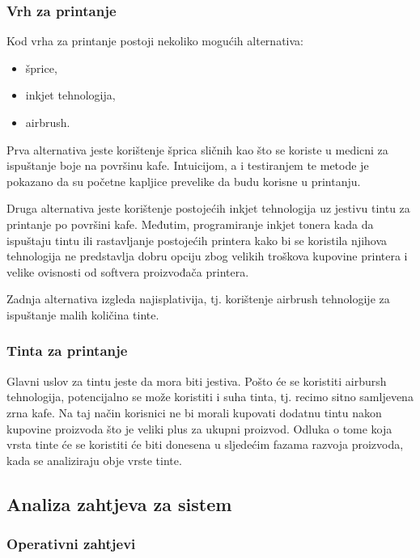 \documentclass[12pt]{article}
\begin{document}
\subsubsection{Vrh za printanje}
Kod vrha za printanje postoji nekoliko mogućih alternativa:
\begin{itemize}
\item šprice,
\item inkjet tehnologija,
\item airbrush.
\end{itemize}

Prva alternativa jeste korištenje šprica sličnih kao što se koriste u medicni za ispuštanje boje na površinu kafe. Intuicijom, a i testiranjem te metode je pokazano da su početne kapljice prevelike da budu korisne u printanju.

Druga alternativa jeste korištenje postojećih inkjet tehnologija uz jestivu tintu za printanje po površini kafe. Međutim, programiranje inkjet tonera kada da ispuštaju tintu ili rastavljanje postojećih printera kako bi se koristila njihova tehnologija ne predstavlja dobru opciju zbog velikih troškova kupovine printera i velike ovisnosti od softvera proizvođača printera.

Zadnja alternativa izgleda najisplativija, tj. korištenje airbrush tehnologije za ispuštanje malih količina tinte. 

\subsubsection{Tinta za printanje}

Glavni uslov za tintu jeste da mora biti jestiva. Pošto će se koristiti airbursh tehnologija, potencijalno se može koristiti i suha tinta, tj. recimo sitno samljevena zrna kafe. Na taj način korisnici ne bi morali kupovati dodatnu tintu nakon kupovine proizvoda što je veliki plus za ukupni proizvod. Odluka o tome koja vrsta tinte će se koristiti će biti donesena u sljedećim fazama razvoja proizvoda, kada se analiziraju obje vrste tinte.

\newpage

\subsection{Analiza zahtjeva za sistem}
\subsubsection{Operativni zahtjevi}
\end{document}
